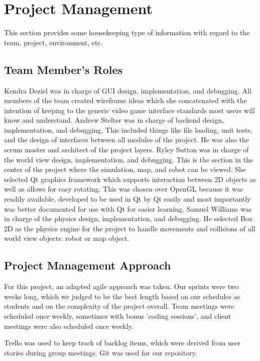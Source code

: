 

\chapter{Project Management}
This section provides some housekeeping type of information with regard to the 
team, project, environment, etc. 



\section{Team Member's Roles}
Kendra Deziel was in charge of GUI design, implementation, and debugging. All members of the team created wireframe ideas which she concatenated with the intention of keeping to the generic video game interface standards most users will know and understand.
Andrew Stelter was in charge of backend design, implementation, and debugging. This included things like file loading, unit tests, and the design of interfaces between all modules of the project. He was also the scrum master and architect of the project layers.
Ryley Sutton was in charge of the world view design, implementation, and debugging. This is the section in the center of the project where the simulation, map, and robot can be viewed. She selected Qt graphics framework which supports interaction between 2D objects as well as allows for easy rotating. This was chosen over OpenGL because it was readily available, developed to be used in Qt by Qt easily and most importantly was better documented for use with Qt for easier learning.  
Samuel Williams was in charge of the physics design, implementation, and debugging. He selected Box 2D as the physics engine for the project to handle movements and collisions of all world view objects: robot or map object.


\section{Project  Management Approach}
For this project, an adapted agile approach was taken. Our sprints were two weeks long, which we judged to be the best length based on our schedules as students and on the complexity of the project overall. Team meetings were scheduled once weekly, sometimes with bonus 'coding sessions', and client meetings were also scheduled once weekly. 

Trello was used to keep track of backlog items, which were derived from user stories during group meetings. Git was used for our repository.

